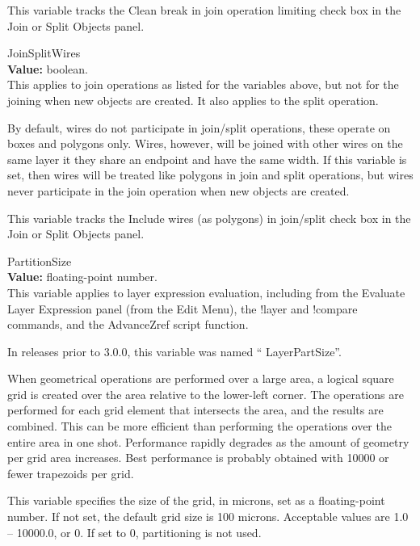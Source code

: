 \begin{description}
This variable tracks the {\cb Clean break in join operation limiting}
check box in the {\cb Join or Split Objects} panel.

\item{\et JoinSplitWires}\\
{\bf Value:} boolean.\\
This applies to join operations as listed for the variables above, but
not for the joining when new objects are created.  It also applies to
the split operation.

By default, wires do not participate in join/split operations, these
operate on boxes and polygons only.  Wires, however, will be joined
with other wires on the same layer it they share an endpoint and have
the same width.  If this variable is set, then wires will be treated
like polygons in join and split operations, but wires never
participate in the join operation when new objects are created. 

This variable tracks the {\cb Include wires (as polygons) in
join/split} check box in the {\cb Join or Split Objects} panel.

\item{\et PartitionSize}\\
{\bf Value:} floating-point number.\\
This variable applies to layer expression evaluation, including from
the {\cb Evaluate Layer Expression} panel (from the {\cb Edit Menu}),
the {\cb !layer} and {\cb !compare} commands, and the {\vt
AdvanceZref} script function.

In releases prior to 3.0.0, this variable was named ``{\et
LayerPartSize}''.

When geometrical operations are performed over a large area, a logical
square grid is created over the area relative to the lower-left
corner.  The operations are performed for each grid element that
intersects the area, and the results are combined.  This can be more
efficient than performing the operations over the entire area in one
shot.  Performance rapidly degrades as the amount of geometry per grid
area increases.  Best performance is probably obtained with 10000 or
fewer trapezoids per grid.
 
This variable specifies the size of the grid, in microns, set as a
floating-point number.  If not set, the default grid size is 100
microns.  Acceptable values are 1.0 -- 10000.0, or 0.  If set to
0, partitioning is not used.


\end{description}
